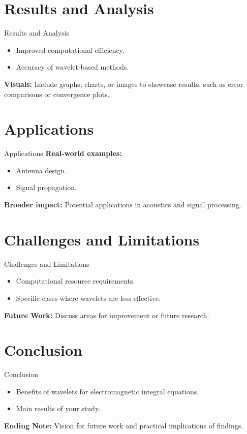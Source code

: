\documentclass{beamer}
\begin{document}
\section{Results and Analysis}
\begin{frame}{Results and Analysis}
    \begin{itemize}
        \item Improved computational efficiency.
        \item Accuracy of wavelet-based methods.
    \end{itemize}
    \textbf{Visuals:} Include graphs, charts, or images to showcase results, such as error comparisons or convergence plots.
\end{frame}

\section{Applications}
\begin{frame}{Applications}
    \textbf{Real-world examples:}
    \begin{itemize}
        \item Antenna design.
        \item Signal propagation.
    \end{itemize}
    \textbf{Broader impact:} Potential applications in acoustics and signal processing.
\end{frame}

\section{Challenges and Limitations}
\begin{frame}{Challenges and Limitations}
    \begin{itemize}
        \item Computational resource requirements.
        \item Specific cases where wavelets are less effective.
    \end{itemize}
    \textbf{Future Work:} Discuss areas for improvement or future research.
\end{frame}

\section{Conclusion}
\begin{frame}{Conclusion}
    \begin{itemize}
        \item Benefits of wavelets for electromagnetic integral equations.
        \item Main results of your study.
    \end{itemize}
    \textbf{Ending Note:} Vision for future work and practical implications of findings.
\end{frame}
\end{document}
